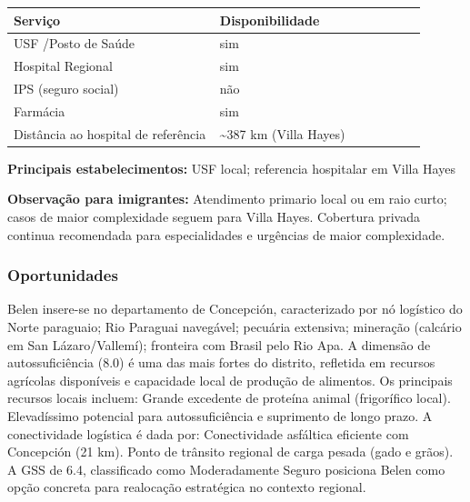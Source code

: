 {\def\LTcaptype{none} %
\begin{longtable}{@{}>{\raggedright\arraybackslash}p{0.45\linewidth} >{\raggedright\arraybackslash}p{0.45\linewidth}@{}}
\toprule\noalign{}
Serviço & Disponibilidade \\
\midrule\noalign{}
\endhead
\bottomrule\noalign{}
\endlastfoot
USF /\allowbreak \allowbreak  Posto de Saúde & sim \\
Hospital Regional & sim \\
IPS (seguro social) & não \\
Farmácia & sim \\
Distância ao hospital de referência & \textasciitilde387 km (Villa
Hayes) \\
\end{longtable}
}

\textbf{Principais estabelecimentos:} USF local; referencia hospitalar
em Villa Hayes

\textbf{Observação para imigrantes:} Atendimento primario local ou em
raio curto; casos de maior complexidade seguem para Villa Hayes.
Cobertura privada continua recomendada para especialidades e urgências
de maior complexidade.
\newpage

\subsubsection*{Oportunidades}\label{oport-belen-0102}
Belen insere-se no departamento de Concepción, caracterizado por nó logístico do Norte paraguaio; Rio Paraguai navegável; pecuária extensiva; mineração (calcário em San Lázaro/Vallemí); fronteira com Brasil pelo Rio Apa. A dimensão de autossuficiência (8.0) é uma das mais fortes do distrito, refletida em recursos agrícolas disponíveis e capacidade local de produção de alimentos. Os principais recursos locais incluem: Grande excedente de proteína animal (frigorífico local). Elevadíssimo potencial para autossuficiência e suprimento de longo prazo. A conectividade logística é dada por: Conectividade asfáltica eficiente com Concepción (21 km). Ponto de trânsito regional de carga pesada (gado e grãos). A GSS de 6.4, classificado como Moderadamente Seguro posiciona Belen como opção concreta para realocação estratégica no contexto regional.

